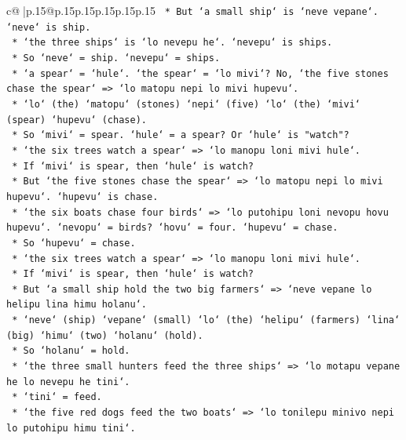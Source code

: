 \documentclass{article}
\begin{document}
{\begin{supertabular}{c@{$\;$}|p{.15\linewidth}@{}p{.15\linewidth}p{.15\linewidth}p{.15\linewidth}p{.15\linewidth}p{.15\linewidth}}
{{{\texttt{                *   But `a small ship` is `neve vepane`. `neve` is ship.} \\
\texttt{                *   `the three ships` is `lo nevepu he`. `nevepu` is ships.} \\
\texttt{                *   So `neve` = ship. `nevepu` = ships.} \\
\texttt{                *   `a spear` = `hule`. `the spear` = `lo mivi`? No, `the five stones chase the spear` => `lo matopu nepi lo mivi hupevu`.} \\
\texttt{                *   `lo` (the) `matopu` (stones) `nepi` (five) `lo` (the) `mivi` (spear) `hupevu` (chase).} \\
\texttt{                *   So `mivi` = spear. `hule` = a spear? Or `hule` is "watch"?} \\
\texttt{                *   `the six trees watch a spear` => `lo manopu loni mivi hule`.} \\
\texttt{                *   If `mivi` is spear, then `hule` is watch?} \\
\texttt{                *   But `the five stones chase the spear` => `lo matopu nepi lo mivi hupevu`. `hupevu` is chase.} \\
\texttt{                *   `the six boats chase four birds` => `lo putohipu loni nevopu hovu hupevu`. `nevopu` = birds? `hovu` = four. `hupevu` = chase.} \\
\texttt{                *   So `hupevu` = chase.} \\
\texttt{                *   `the six trees watch a spear` => `lo manopu loni mivi hule`.} \\
\texttt{                *   If `mivi` is spear, then `hule` is watch?} \\
\texttt{                *   But `a small ship hold the two big farmers` => `neve vepane lo helipu lina himu holanu`.} \\
\texttt{                *   `neve` (ship) `vepane` (small) `lo` (the) `helipu` (farmers) `lina` (big) `himu` (two) `holanu` (hold).} \\
\texttt{                *   So `holanu` = hold.} \\
\texttt{                *   `the three small hunters feed the three ships` => `lo motapu vepane he lo nevepu he tini`.} \\
\texttt{                *   `tini` = feed.} \\
\texttt{                *   `the five red dogs feed the two boats` => `lo tonilepu minivo nepi lo putohipu himu tini`.} \\
}}}
\end{supertabular}}
\end{document}
